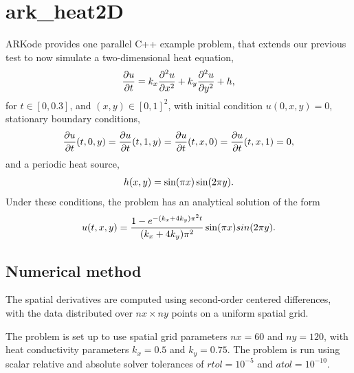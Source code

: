 \documentclass[letterpaper,10pt,english]{sphinxmanual}
\begin{document}
\section{ark\_heat2D}
\label{cpp_parallel:ark-heat2d}\label{cpp_parallel:id1}
ARKode provides one parallel C++ example problem, that extends our
previous {\hyperref[c_serial:ark-heat1d]{\emph{}}} test to now simulate a two-dimensional heat
equation,
\begin{gather}
\begin{split}\frac{\partial u}{\partial t} = k_x \frac{\partial^2 u}{\partial x^2}
                              + k_y \frac{\partial^2 u}{\partial y^2} + h,\end{split}\notag
\end{gather}
for \(t \in [0, 0.3]\), and \((x,y) \in [0, 1]^2\), with initial
condition \(u(0,x,y) = 0\), stationary boundary conditions,
\begin{gather}
\begin{split}\frac{\partial u}{\partial t}(t,0,y) = \frac{\partial u}{\partial t}(t,1,y) =
\frac{\partial u}{\partial t}(t,x,0) = \frac{\partial u}{\partial t}(t,x,1) = 0,\end{split}\notag
\end{gather}
and a periodic heat source,
\begin{gather}
\begin{split}h(x,y) = \sin(\pi x) \sin(2\pi y).\end{split}\notag
\end{gather}
Under these conditions, the problem has an analytical solution of the
form
\begin{gather}
\begin{split}u(t,x,y) = \frac{1 - e^{-(k_x+4k_y)\pi^2 t}}{(k_x+4k_y)\pi^2} \sin(\pi x) sin(2\pi y).\end{split}\notag
\end{gather}

\subsection{Numerical method}
\label{cpp_parallel:numerical-method}
The spatial derivatives are computed using second-order centered
differences, with the data distributed over \(nx\times ny\) points
on a uniform spatial grid.

The problem is set up to use spatial grid parameters \(nx=60\) and
\(ny=120\), with heat conductivity parameters \(k_x=0.5\) and
\(k_y=0.75\).  The problem is run using scalar relative and
absolute solver tolerances of \(rtol=10^{-5}\) and
\(atol=10^{-10}\).
\end{document}
